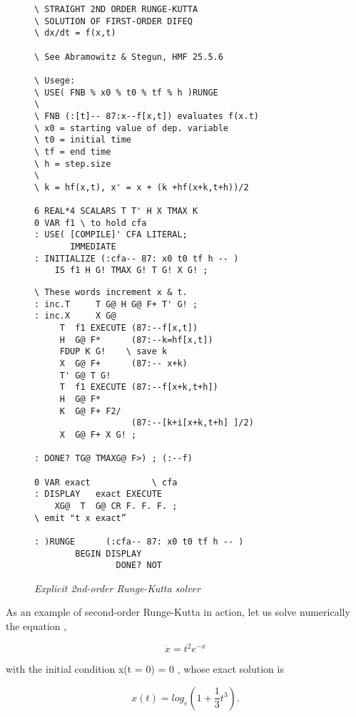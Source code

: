 \begin{figure}
    \tiny
    \begin{tcolorbox} [sidebyside, colback=white, sharp corners, enhanced, segmentation style=solid]
    \begin{lstlisting}
\ STRAIGHT 2ND ORDER RUNGE-KUTTA
\ SOLUTION OF FIRST-ORDER DIFEQ
\ dx/dt = f(x,t)

\ See Abramowitz & Stegun, HMF 25.5.6

\ Usege:
\ USE( FNB % x0 % t0 % tf % h )RUNGE
\
\ FNB (:[t]-- 87:x--f[x,t]) evaluates f(x.t)
\ x0 = starting value of dep. variable
\ t0 = initial time
\ tf = end time
\ h = step.size
\
\ k = hf(x,t), x' = x + (k +hf(x+k,t+h))/2

6 REAL*4 SCALARS T T' H X TMAX K
0 VAR f1 \ to hold cfa
: USE( [COMPILE]' CFA LITERAL;
       IMMEDIATE
: INITIALIZE (:cfa-- 87: x0 t0 tf h -- )
    IS f1 H G! TMAX G! T G! X G! ;
    \end{lstlisting}
\tcblower
    \begin{lstlisting}
\ These words increment x & t.
: inc.T     T G@ H G@ F+ T' G! ;
: inc.X     X G@
     T  f1 EXECUTE (87:--f[x,t])
     H  G@ F*      (87:--k=hf[x,t])
     FDUP K G!    \ save k
     X  G@ F+      (87:-- x+k)
     T' G@ T G!
     T  f1 EXECUTE (87:--f[x+k,t+h])
     H  G@ F*
     K  G@ F+ F2/
                   (87:--[k+i[x+k,t+h] ]/2)
     X  G@ F+ X G! ;

: DONE? TG@ TMAXG@ F>) ; (:--f)

0 VAR exact            \ cfa
: DISPLAY   exact EXECUTE
    XG@  T  G@ CR F. F. F. ;
\ emit "t x exact”

: )RUNGE      (:cfa-- 87: x0 t0 tf h -- )
        BEGIN DISPLAY
                DONE? NOT
    \end{lstlisting}
    \end{tcolorbox}
    \caption{\textit{Explicit 2nd-order Runge-Kutta solver}}
    \label{fig:06_07}
\end{figure}

As an example of second-order Runge-Kutta in action, let us solve numerically the equation ,

\begin{equation}
    \dot{x} = t^2 e^{-x}
    \label{eq:06_21} 
\end{equation}

with the initial condition x(t = 0) = 0 , whose exact solution is

\begin{equation}
    x(t) =log_e(1 +\frac{1}{3}t^3).
    \label{eq:06_22} 
\end{equation}

